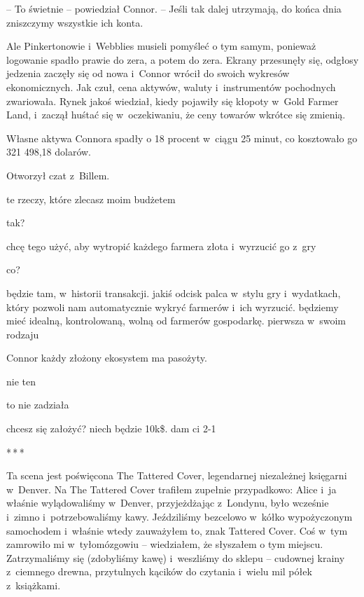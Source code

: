 \documentclass[oneside,polish,11pt,rmheadings]{mwbk}
\newcommand{\threeast}{\par\centerline{*\,*\,*}\medskip\par}
\begin{document}
-- To świetnie -- powiedział Connor. -- Jeśli tak dalej utrzymają, do końca dnia zniszczymy wszystkie ich konta.

Ale Pinkertonowie i~Webblies musieli pomyśleć o tym samym, ponieważ logowanie spadło prawie do zera, a potem do zera. Ekrany przesunęły się, odgłosy jedzenia zaczęły się od nowa i~Connor wrócił do swoich wykresów ekonomicznych. Jak czuł, cena aktywów, waluty i~instrumentów pochodnych zwariowała. Rynek jakoś wiedział, kiedy pojawiły się kłopoty w~Gold Farmer Land, i~zaczął huśtać się w~oczekiwaniu, że ceny towarów wkrótce się zmienią.

Własne aktywa Connora spadły o 18 procent w~ciągu 25 minut, co kosztowało go 321 498,18 dolarów.

Otworzył czat z~Billem.

\noindent {\textgreater} te rzeczy, które zlecasz moim budżetem

\noindent {\textgreater} tak?

\noindent {\textgreater} chcę tego użyć, aby wytropić każdego farmera złota i~wyrzucić go z~gry

\noindent {\textgreater} co?

\noindent {\textgreater} będzie tam, w~historii transakcji. jakiś odcisk palca w~stylu gry i~wydatkach, który pozwoli nam automatycznie wykryć farmerów i~ich wyrzucić. będziemy mieć idealną, kontrolowaną, wolną od farmerów gospodarkę. pierwsza w~swoim rodzaju

\noindent {\textgreater} Connor każdy złożony ekosystem ma pasożyty.

\noindent {\textgreater} nie ten

\noindent {\textgreater} to nie zadziała

\noindent {\textgreater} chcesz się założyć? niech będzie 10k\$. dam ci 2-1

\bigskip
\threeast

Ta scena jest poświęcona The Tattered Cover, legendarnej niezależnej księgarni w~Denver. Na The Tattered Cover trafiłem zupełnie przypadkowo: Alice i~ja właśnie wylądowaliśmy w~Denver, przyjeżdżając z~Londynu, było wcześnie i~zimno i~potrzebowaliśmy kawy. Jeździliśmy bezcelowo w~kółko wypożyczonym samochodem i~właśnie wtedy zauważyłem to, znak Tattered Cover. Coś w~tym zamrowiło mi w~tyłomózgowiu -- wiedziałem, że słyszałem o tym miejscu. Zatrzymaliśmy się (zdobyliśmy kawę) i~weszliśmy do sklepu -- cudownej krainy z~ciemnego drewna, przytulnych kącików do czytania i~wielu mil półek z~książkami.
\end{document}
